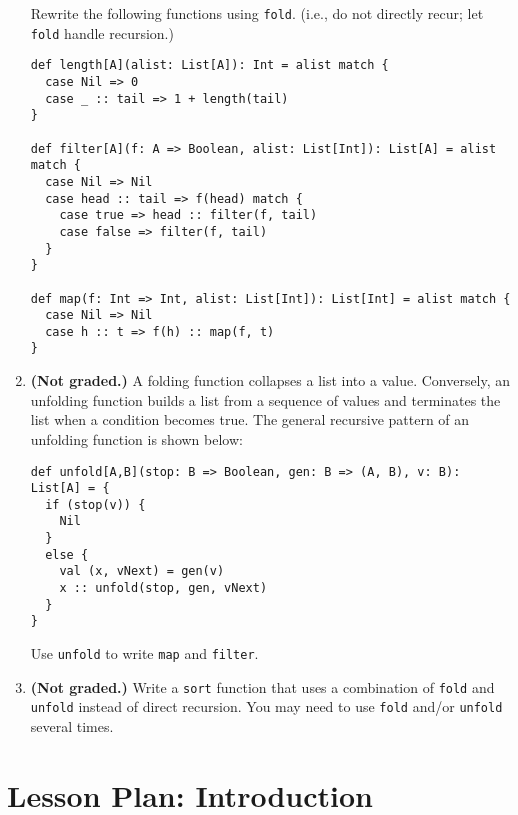 \documentclass[9pt]{extbook}
\begin{document}
\begin{enumerate}
Rewrite the following functions using \lstinline|fold|. (i.e., do not directly
recur; let \lstinline|fold| handle recursion.)

\begin{lstlisting}
def length[A](alist: List[A]): Int = alist match {
  case Nil => 0
  case _ :: tail => 1 + length(tail)
}
  
def filter[A](f: A => Boolean, alist: List[Int]): List[A] = alist match {
  case Nil => Nil
  case head :: tail => f(head) match {
    case true => head :: filter(f, tail)
    case false => filter(f, tail)
  }
}

def map(f: Int => Int, alist: List[Int]): List[Int] = alist match {
  case Nil => Nil
  case h :: t => f(h) :: map(f, t)
}
\end{lstlisting}

\item \textbf{(Not graded.)} A folding function collapses a list into a value.
Conversely, an unfolding function builds a list from a sequence of values and
terminates the list when a condition becomes true. The general recursive
pattern of an unfolding function is shown below:

\begin{lstlisting}
def unfold[A,B](stop: B => Boolean, gen: B => (A, B), v: B): List[A] = {
  if (stop(v)) {
    Nil
  }
  else {
    val (x, vNext) = gen(v)
    x :: unfold(stop, gen, vNext)
  }
}
\end{lstlisting}

Use \lstinline|unfold| to write \lstinline|map| and \lstinline|filter|.

\item \textbf{(Not graded.)} Write a \lstinline|sort| function that uses
a combination of \lstinline|fold| and \lstinline|unfold| instead of direct
recursion. You may need to use \lstinline|fold| and/or \lstinline|unfold| several times.

\end{enumerate}




\appendix

\chapter{Lesson Plan: Introduction}
\end{document}
